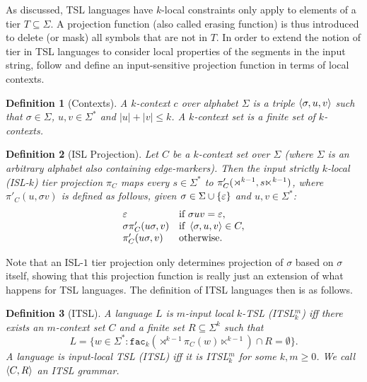 \documentclass[11pt,a4paper]{article}
\newcommand{\facn}[1]{\ensuremath{\texttt{fac}_{#1}}}
\newtheorem{definition}{Definition}
\begin{document}
As discussed, TSL languages  have $k$-local constraints only apply to elements of a tier $T \subseteq \Sigma$.
A projection function (also called erasing function) is thus introduced to delete (or mask) all symbols that are not in $T$.
In order to extend the notion of tier in TSL languages to consider local properties of the segments in the input string, \citet{desanto2019structure} follow \cite{ChandleeHeinz18} and define an input-sensitive projection function in terms of local contexts.
%
\begin{definition}[Contexts]
    A \emph{$k$-context} $c$ over alphabet $\Sigma$ is a triple $\left \langle \sigma, u, v \right \rangle $ such that $\sigma \in \Sigma$, $u, v \in \Sigma^*$ and $|u| + |v| \leq k$.
    A \emph{$k$-context set} is a finite set of $k$-contexts.
\end{definition}
%
\begin{definition}[ISL Projection]
    Let $C$ be a $k$-context set over $\Sigma$ (where $\Sigma$ is an arbitrary alphabet also containing edge-markers).
    Then the \emph{input strictly $k$-local} (ISL-$k$) tier projection $\pi_C$ maps every $s \in \Sigma^*$ to $\pi'_C(\rtimes^{k-1}, s\ltimes^{k-1})$, where $\pi'_C(u, \sigma v)$ is defined as follows, given $\sigma \in \Sigma \cup \left \{ \varepsilon \right \}$ and $u,v \in \Sigma^*$:
    \[
    \begin{array}{ll}
        \varepsilon & \text{if } \sigma u v = \varepsilon,\\
        \sigma \pi'_C(u\sigma, v) & \text{if } \left \langle \sigma, u, v \right \rangle  \in C,\\
        \pi'_C(u\sigma, v) & \text{otherwise.}
    \end{array}
    \]
\end{definition}
Note that an ISL-$1$ tier projection only determines projection of $\sigma$ based on $\sigma$ itself, showing that this projection function is really just an extension of what happens for TSL languages\@.
The definition of ITSL languages then  is as follows\@.

\begin{definition}[ITSL]
A language $L$ is \emph{$m$-input local $k$-TSL} (ITSL$^m_k$) iff there exists an $m$-context set $C$ and a finite set $R \subseteq \Sigma^k$ such that
\[
L = \{ w \in \Sigma^*: \facn{k}(\rtimes^{k-1} \pi_C(w) \ltimes^{k-1})  \cap R = \emptyset \}.
\]
A language is \emph{input-local TSL} (ITSL) iff it is ITSL$^m_k$ for some $k, m \geq 0$.
We call $\left \langle C, R \right \rangle $ an ITSL grammar.
\label{dfn:ITSL}
\end{definition}
\end{document}
